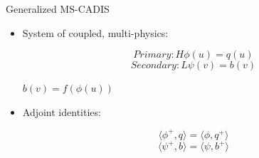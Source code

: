 \documentclass{beamer}
\begin{document}
\begin{frame}{Generalized MS-CADIS}
\begin{itemize}
  \item{System of coupled, multi-physics:}

	\begin{center}
          \begin{equation}
		Primary:	H\phi(u) = q(u)
          \end{equation}
		\vspace{-0.4cm}          
          \begin{equation}
		 Secondary:	L\psi(v) = b(v)
          \end{equation}
	\end{center}

	\begin{center}
		\vspace{0.4cm}
		$b(v) = f(\phi(u))$
	\end{center}
  \pause
  \item{Adjoint identities:}
	\begin{center}
          \begin{equation}
          	\langle \phi^{+}, q \rangle =
          	\langle \phi, q^{+} \rangle 
          \end{equation}
		\vspace{-0.4cm}          
          \begin{equation}
          	\langle \psi^{+}, b \rangle =
          	\langle \psi, b^{+} \rangle 
          \end{equation}
	\end{center}
\end{itemize}
\end{frame}
\end{document}
